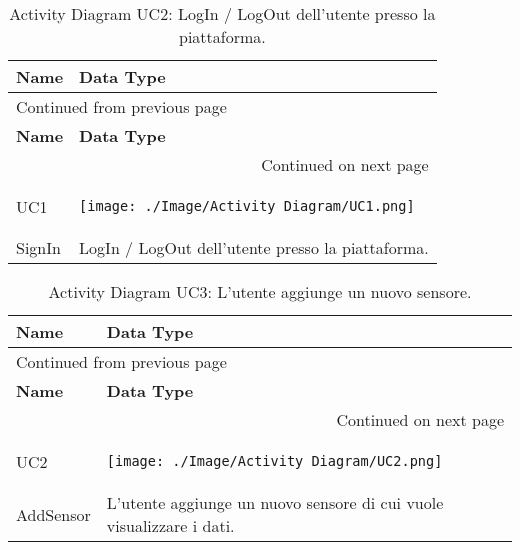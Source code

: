 \documentclass[onecolumn,a4paper]{article}
\begin{document}
\begin{longtable}{|p{2cm}|p{12cm}|}
\caption{Activity Diagram UC2:  LogIn / LogOut dell’utente presso la piattaforma.}
\\
\cellcolor{grey!15} \textbf{Name} & \cellcolor{grey!15} \textbf{Data Type}\\
\hline
\endfirsthead
\multicolumn{2}{l}{Continued from previous page} \\
\hline

\cellcolor{grey!15} \textbf{Name} & \cellcolor{grey!15} \textbf{Data Type} \\

\hline
\endhead
\hline\multicolumn{2}{r}{Continued on next page} \\
\endfoot
\endlastfoot
\hline
UC1 & \begin{center}
\texttt{[image: ./Image/Activity Diagram/UC1.png]}
\end{center}\\
\hline
SignIn & LogIn / LogOut dell’utente presso la piattaforma.\\
\hline
\end{longtable}

\begin{longtable}{|p{2cm}|p{12cm}|}
\caption{Activity Diagram UC3: L’utente aggiunge un nuovo sensore.}
\\
\cellcolor{grey!15} \textbf{Name} & \cellcolor{grey!15} \textbf{Data Type}\\
\hline
\endfirsthead
\multicolumn{2}{l}{Continued from previous page} \\
\hline

\cellcolor{grey!15} \textbf{Name} & \cellcolor{grey!15} \textbf{Data Type} \\

\hline
\endhead
\hline\multicolumn{2}{r}{Continued on next page} \\
\endfoot
\endlastfoot
\hline
UC2 & \begin{center}
\texttt{[image: ./Image/Activity Diagram/UC2.png]}
\end{center}\\
\hline
AddSensor & L’utente aggiunge un nuovo sensore di cui vuole visualizzare i dati.\\
\hline
\end{longtable}
\end{document}
